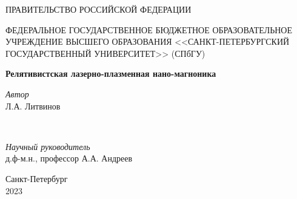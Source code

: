 \begin{titlepage}
    \begin{center} 
        
        

        \large{
            \MakeUppercase{Правительство Российской Федерации}

            \MakeUppercase{Федеральное государственное бюджетное образовательное учреждение высшего образования <<Санкт-Петербургский государственный университет>>} (СПбГУ)
        }

        \vfill\vfill

        \begin{figure}[h]
        \end{figure}

        \vfill
        
        {\huge\bfseries Релятивистская лазерно-плазменная нано-магноника}

        \vfill
        
    
        \begin{minipage}{0.4\textwidth}
            \begin{flushleft}
                \large
                \textit{Автор}\\ Л.А. Литвинов
            \end{flushleft}
        \end{minipage}
        ~
        \begin{minipage}{0.5\textwidth}
            \begin{flushright}
                \large
                \textit{Научный руководитель}\\ д.ф-м.н., профессор А.А. Андреев
            \end{flushright}
        \end{minipage}
        
        
        \vfill\vfill\vfill
        
        {\large{Санкт-Петербург \\ 2023}}
        
    \end{center}
\end{titlepage}